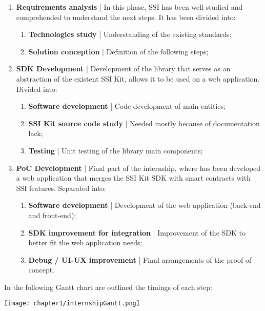 \begin{enumerate}
    \item \textbf{Requirements analysis} | In this phase, SSI has been well studied 
    and comprehended to understand the next steps. It has been divided into:
    \vspace*{-0.1cm}
    \begin{enumerate}
        \setlength\itemsep{-0.1em}
        \item \textbf{Technologies study} | Understanding of the existing standards;
        \item \textbf{Solution conception} | Definition of the following steps;
    \end{enumerate}
    \vspace*{0.1cm}
    \item \textbf{SDK Development} | Development of the library that serves as 
    an abstraction of the existent SSI Kit, allows it to be used on a web application.
    Divided into:
    \vspace*{-0.1cm}
    \begin{enumerate}
        \setlength\itemsep{-0.1em}
        \item \textbf{Software development} | Code development of main entities;
        \item \textbf{SSI Kit source code study} | Needed mostly because of 
        documentation lack;
        \item \textbf{Testing} | Unit testing of the library main components;
    \end{enumerate}
    \vspace*{0.1cm}
    \item \textbf{PoC Development} | Final part of the internship, where has been
    developed a web application that merges the SSI Kit SDK with smart contracts
    with SSI features. Separated into:
    \vspace*{-0.1cm}
    \begin{enumerate}
        \setlength\itemsep{-0.1em}
        \item \textbf{Software development} | Development of the web application (back-end and
        front-end);
        \item \textbf{SDK improvement for integration} | Improvement of the SDK to better 
        fit the web application needs;
        \item \textbf{Debug / UI-UX improvement} | Final arrangements of the proof of concept.
    \end{enumerate}
\end{enumerate}
In the following Gantt chart are outlined the timings of each step:
\begin{center}
    \hspace*{-1cm}
    \texttt{[image: chapter1/internshipGantt.png]}
\end{center}

